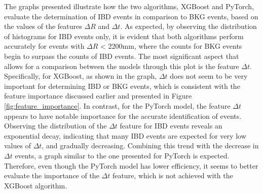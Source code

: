 The graphs presented illustrate how the two algorithms, XGBoost and PyTorch, evaluate the determination of IBD events in comparison to BKG events, based on the values of the features $\Delta R$ and $\Delta t$. As expected, by observing the distribution of histograms for IBD events only, it is evident that both algorithms perform accurately for events with $\Delta R$ < 2200mm, where the counts for BKG events begin to surpass the counts of IBD events. The most significant aspect that allows for a comparison between the models through this plot is the feature $\Delta t$. Specifically, for XGBoost, as shown in the graph, $\Delta t$ does not seem to be very important for determining IBD or BKG events, which is consistent with the feature importance discussed earlier and presented in Figure \ref{fig:feature_importance}. In contrast, for the PyTorch model, the feature $\Delta t$ appears to have notable importance for the accurate identification of events. 
Observing the distribution of the $\Delta t$ feature for IBD events reveals an exponential decay, indicating that many IBD events are expected for very low values of $\Delta t$, and gradually decreasing. Combining this trend with the decrease in $\Delta t$ events, a graph similar to the one presented for PyTorch is expected. Therefore, even though the PyTorch model has lower efficiency, it seems to better evaluate the importance of the $\Delta t$ feature, which is not achieved with the XGBoost algorithm.


